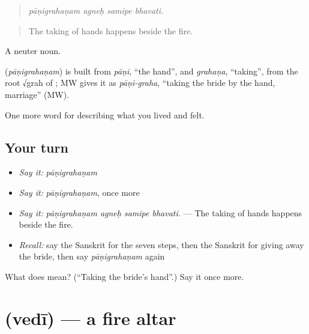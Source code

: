 \begin{quote}
\emph{pāṇigrahaṇam agneḥ samīpe bhavati.}
\end{quote}

\begin{quote}
The taking of hands happens beside the fire.
\end{quote}

A neuter noun.

\begin{cousinweb}
\textbf{} (\emph{pāṇigrahaṇam}) is built from \emph{pāṇi}, \textquotedblleft{}the hand\textquotedblright{}, and \emph{grahaṇa}, \textquotedblleft{}taking\textquotedblright{}, from the root √grah of \textbf{}; MW gives it as \emph{pāṇi-graha}, \textquotedblleft{}taking the bride by the hand, marriage\textquotedblright{} (MW).
\end{cousinweb}

\begin{grammarlens}[title={What you've built}]
One more word for describing what you lived and felt.
\end{grammarlens}

\subsection*{Your turn}
\begin{itemize}
\raggedright
  \item \emph{Say it:} \emph{pāṇigrahaṇam}
  \item \emph{Say it:} \emph{pāṇigrahaṇam}, once more
  \item \emph{Say it:} \emph{pāṇigrahaṇam agneḥ samīpe bhavati.} — The taking of hands happens beside the fire.
  \item \emph{Recall:} say the Sanskrit for the seven steps, then the Sanskrit for giving away the bride, then say \emph{pāṇigrahaṇam} again
\end{itemize}

\begin{tcolorbox}[breakable,colback=teal!4,colframe=teal!35!black,title={Before you move on}]
What does  mean? (\textquotedblleft{}Taking the bride's hand\textquotedblright{}.) Say it once more.
\end{tcolorbox}
\section[\texorpdfstring{\sk{वेदी} (vedī)}{वेदी (vedī)}]{ (vedī) — a fire altar}

